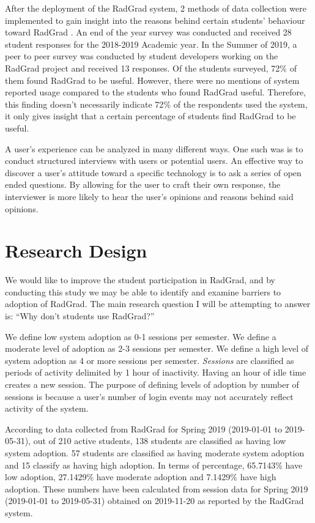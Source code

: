 \documentclass[english]{proposalnsf}
\begin{document}
After the deployment of the RadGrad system, 2 methods of data collection were implemented to gain insight into the reasons behind certain students' behaviour toward RadGrad \cite{Johnson_RadGrad_2020}.  An end of the year survey was conducted and received 28 student responses for the 2018-2019 Academic year. In the Summer of 2019, a peer to peer survey was conducted by student developers working on the RadGrad project and received 13 responses. Of the students surveyed, 72{\%} of them found RadGrad to be useful. However, there were no mentions of system reported usage compared to the students who found RadGrad useful. Therefore, this finding doesn't necessarily indicate 72{\%} of the respondents used the system, it only gives insight that a certain percentage of students find RadGrad to be useful.

A user's experience can be analyzed in many different ways. One such was is to conduct structured interviews with users or potential users. An effective way to discover a user's attitude toward a specific technology is to ask a series of open ended questions. By allowing for the user to craft their own response, the interviewer is more likely to hear the user's opinions and reasons behind said opinions. \cite{Sharp_Interaction_2002} 

\section{Research Design}
\label{research-design}

We would like to improve the student participation in RadGrad, and by conducting this study we may be able to identify and examine barriers to adoption of RadGrad. The main research question I will be attempting to answer is: ``Why don't students use RadGrad?''

We define low system adoption as 0-1 sessions per semester. We define a moderate level of adoption as 2-3 sessions per semester.  We define a high level of system adoption as 4 or more sessions per semester. 
{\em Sessions} are classified as periods of activity delimited by 1 hour of inactivity. Having an hour of idle time creates a new session. The purpose of defining levels of adoption by number of sessions is because a user's number of login events may not accurately reflect activity of the system. 

According to data collected from RadGrad for Spring 2019 (2019-01-01 to 2019-05-31), out of 210 active students, 138 students are classified as having low system adoption. 57 students are classified as having moderate system adoption and 15 classify as having high adoption. In terms of percentage, 65.7143{\%} have low adoption, 27.1429{\%} have moderate adoption and 7.1429{\%} have high adoption. These numbers have been calculated from session data for Spring 2019 (2019-01-01 to 2019-05-31) obtained on 2019-11-20 as reported by the RadGrad system. 
\end{document}
